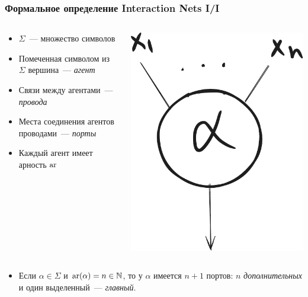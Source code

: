 \documentclass
  [ russian
  , aspectratio=169 %
  ] {beamer}
\begin{document}
\begin{frame}
    \frametitle{Формальное определение Interaction Nets I/I}

    \begin{columns}[totalwidth=\textwidth]
        \begin{column}{0.6\linewidth}
            \begin{itemize}
                \item $\Sigma$~--- множество символов
                \item Помеченная символом из $\Sigma$ вершина~--- \textit{агент}
                \item Связи между агентами~--- \textit{провода}
                \item Места соединения агентов проводами~--- \textit{порты}
                \item Каждый агент имеет арность $\operatorname{ar}$
            \end{itemize}
        \end{column}
        \begin{column}{0.4\linewidth}
            \begin{center}
                \includegraphics[width=0.3\linewidth]{figures/in_agent.pdf}
            \end{center}
        \end{column}
    \end{columns}
    \begin{itemize}
        \item Если $\alpha \in \Sigma$ и $\operatorname{ar}(\alpha) = n \in \mathbb{N}$, то у $\alpha$ имеется $n+1$ портов: $n$ \textit{дополнительных} и один выделенный~--- \textit{главный}.
    \end{itemize}

\end{frame}
\end{document}

